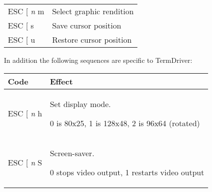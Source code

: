 \documentclass{article}
\begin{document}
\begin{longtable}[]{@{}ll@{}}
\begin{minipage}[t]{0.34\columnwidth}
ESC {[} \emph{n} m\strut
\end{minipage} & \begin{minipage}[t]{0.60\columnwidth}\raggedright
Select graphic rendition\strut
\end{minipage}\tabularnewline
\begin{minipage}[t]{0.34\columnwidth}\raggedright
ESC {[} s\strut
\end{minipage} & \begin{minipage}[t]{0.60\columnwidth}\raggedright
Save cursor position\strut
\end{minipage}\tabularnewline
\begin{minipage}[t]{0.34\columnwidth}\raggedright
ESC {[} u\strut
\end{minipage} & \begin{minipage}[t]{0.60\columnwidth}\raggedright
Restore cursor position\strut
\end{minipage}\tabularnewline
\bottomrule
\end{longtable}

In addition the following sequences are specific to TermDriver:

\begin{longtable}[]{@{}ll@{}}
\toprule
\begin{minipage}[b]{0.34\columnwidth}\raggedright
Code\strut
\end{minipage} & \begin{minipage}[b]{0.60\columnwidth}\raggedright
Effect\strut
\end{minipage}\tabularnewline
\midrule
\endhead
\begin{minipage}[t]{0.34\columnwidth}\raggedright
ESC {[} \emph{n} h\strut
\end{minipage} & \begin{minipage}[t]{0.60\columnwidth}\raggedright
Set display mode.

0 is 80x25, 1 is 128x48, 2 is 96x64 (rotated)\strut
\end{minipage}\tabularnewline
\begin{minipage}[t]{0.34\columnwidth}\raggedright
ESC {[} \emph{n} S\strut
\end{minipage} & \begin{minipage}[t]{0.60\columnwidth}\raggedright
Screen-saver.

0 stops video output, 1 restarts video output\strut
\end{minipage}\tabularnewline
\bottomrule
\end{longtable}
\end{document}
